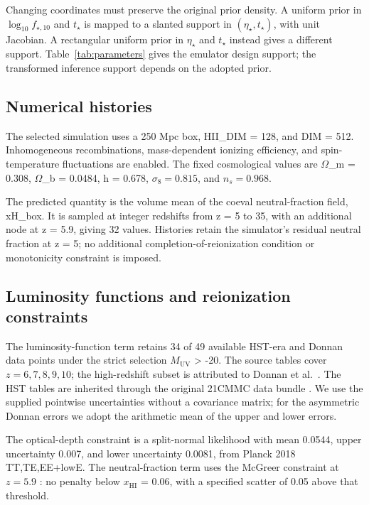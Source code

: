 Changing coordinates must preserve the original prior density. A uniform prior in $\log_{10} f_{\star,10}$ and $t_\star$ is mapped to a slanted support in $(\eta_\star,t_\star)$, with unit Jacobian. A rectangular uniform prior in $\eta_\star$ and $t_\star$ instead gives a different support. Table~\ref{tab:parameters} gives the emulator design support; the transformed inference support depends on the adopted prior.

\subsection{Numerical histories}\label{numerical-histories}

The selected simulation uses a 250 Mpc box, HII\_DIM = 128, and DIM = 512. Inhomogeneous recombinations, mass-dependent ionizing efficiency, and spin-temperature fluctuations are enabled. The fixed cosmological values are \(\Omega\)\_m = 0.308, \(\Omega\)\_b = 0.0484, h = 0.678, $\sigma_8=0.815$, and $n_s=0.968$.

The predicted quantity is the volume mean of the coeval neutral-fraction field, xH\_box. It is sampled at integer redshifts from z = 5 to 35, with an additional node at z = 5.9, giving 32 values. Histories retain the simulator's residual neutral fraction at z = 5; no additional completion-of-reionization condition or monotonicity constraint is imposed.

\subsection{Luminosity functions and reionization constraints}\label{luminosity-functions-and-reionization-constraints}\label{observational-data-and-inference}

The luminosity-function term retains 34 of 49 available HST-era and Donnan data points under the strict selection \ensuremath{M_{\mathrm{UV}}} \textgreater{} -20. The source tables cover $z=6,7,8,9,10$; the high-redshift subset is attributed to Donnan et al.~\cite{Donnan2024}. The HST tables are inherited through the original 21CMMC data bundle \cite{Greig2015,Park2019}. We use the supplied pointwise uncertainties without a covariance matrix; for the asymmetric Donnan errors we adopt the arithmetic mean of the upper and lower errors.

The optical-depth constraint \cite{Planck2018} is a split-normal likelihood with mean 0.0544, upper uncertainty 0.007, and lower uncertainty 0.0081, from Planck 2018 TT,TE,EE+lowE. The neutral-fraction term uses the McGreer constraint at $z=5.9$ \cite{McGreer2015}: no penalty below \ensuremath{x_{\mathrm{HI}}} = 0.06, with a specified scatter of 0.05 above that threshold.

